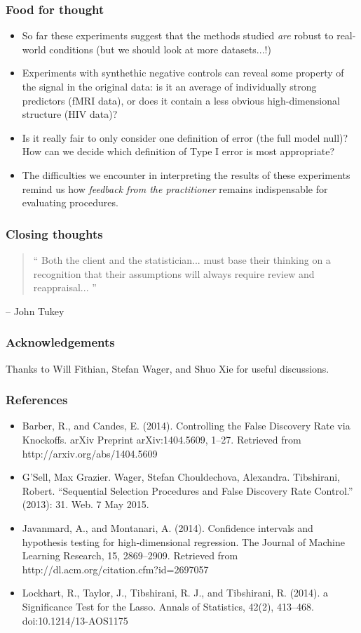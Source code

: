 \documentclass{beamer}
\begin{document}
\begin{frame}
\frametitle{Food for thought}
\begin{itemize}
\item<1-> So far these experiments suggest that the methods studied
  \emph{are} robust to real-world conditions (but we should look at more datasets...!)
\item<2-> Experiments with synthethic negative controls can reveal
  some property of the signal in the original data: is it an average
  of individually strong predictors (fMRI data), or does it contain a
  less obvious high-dimensional structure (HIV data)?
\item<3-> Is it really fair to only consider one definition of error
  (the full model null)?  How can we decide which definition of Type I
  error is most appropriate?
\item<4-> The difficulties we encounter in interpreting the results of
  these experiments remind us how \emph{feedback from the
    practitioner} remains indispensable for evaluating procedures.
\end{itemize}
\end{frame}

\begin{frame}
\frametitle{Closing thoughts}
\begin{quotation}
`` Both the client and the statistician... must base their thinking on
  a recognition that their assumptions will always require review and
  reappraisal...  ''
\end{quotation}
\hfill -- John Tukey
\end{frame}

\begin{frame}
\frametitle{Acknowledgements}
Thanks to Will Fithian, Stefan Wager, and Shuo Xie for useful discussions.
\end{frame}

\begin{frame}
\frametitle{References}
\begin{itemize}
\item Barber, R., and Candes, E. (2014). Controlling the False Discovery Rate via Knockoffs. arXiv Preprint arXiv:1404.5609, 1–27. Retrieved from http://arxiv.org/abs/1404.5609
\item G’Sell, Max Grazier. Wager, Stefan
Chouldechova, Alexandra.
Tibshirani, Robert. “Sequential Selection Procedures and False Discovery Rate Control.” (2013): 31. Web. 7 May 2015.
\item Javanmard, A., and Montanari, A. (2014). Confidence intervals and hypothesis testing for high-dimensional regression. The Journal of Machine Learning Research, 15, 2869–2909. Retrieved from http://dl.acm.org/citation.cfm?id=2697057
\item Lockhart, R., Taylor, J., Tibshirani, R. J., and Tibshirani, R. (2014). a Significance Test for the Lasso. Annals of Statistics, 42(2), 413–468. doi:10.1214/13-AOS1175
\end{itemize}
\end{frame}
\end{document}
